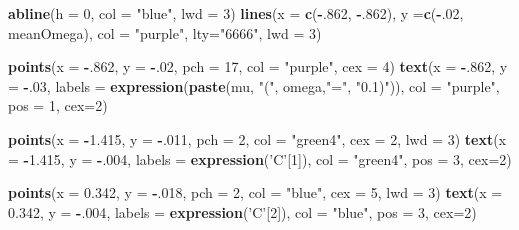 \documentclass[]{article}
\newenvironment{Shaded}{\begin{snugshade}}{\end{snugshade}}
\newcommand{\KeywordTok}[1]{\textcolor[rgb]{0.13,0.29,0.53}{\textbf{#1}}}
\newcommand{\DataTypeTok}[1]{\textcolor[rgb]{0.13,0.29,0.53}{#1}}
\newcommand{\DecValTok}[1]{\textcolor[rgb]{0.00,0.00,0.81}{#1}}
\newcommand{\FloatTok}[1]{\textcolor[rgb]{0.00,0.00,0.81}{#1}}
\newcommand{\StringTok}[1]{\textcolor[rgb]{0.31,0.60,0.02}{#1}}
\newcommand{\OperatorTok}[1]{\textcolor[rgb]{0.81,0.36,0.00}{\textbf{#1}}}
\newcommand{\NormalTok}[1]{#1}
\begin{document}
\begin{Shaded}
\begin{Highlighting}[]
\KeywordTok{abline}\NormalTok{(}\DataTypeTok{h =} \DecValTok{0}\NormalTok{, }\DataTypeTok{col =} \StringTok{"blue"}\NormalTok{, }\DataTypeTok{lwd =} \DecValTok{3}\NormalTok{)}
\KeywordTok{lines}\NormalTok{(}\DataTypeTok{x =} \KeywordTok{c}\NormalTok{(}\OperatorTok{-}\NormalTok{.}\DecValTok{862}\NormalTok{, }\OperatorTok{-}\NormalTok{.}\DecValTok{862}\NormalTok{), }\DataTypeTok{y =}\KeywordTok{c}\NormalTok{(}\OperatorTok{-}\NormalTok{.}\DecValTok{02}\NormalTok{, meanOmega), }\DataTypeTok{col =} \StringTok{"purple"}\NormalTok{, }\DataTypeTok{lty=}\StringTok{"6666"}\NormalTok{, }\DataTypeTok{lwd =} \DecValTok{3}\NormalTok{)}

\KeywordTok{points}\NormalTok{(}\DataTypeTok{x =} \OperatorTok{-}\NormalTok{.}\DecValTok{862}\NormalTok{, }\DataTypeTok{y =} \OperatorTok{-}\NormalTok{.}\DecValTok{02}\NormalTok{, }\DataTypeTok{pch =} \DecValTok{17}\NormalTok{, }\DataTypeTok{col =} \StringTok{"purple"}\NormalTok{, }\DataTypeTok{cex =} \DecValTok{4}\NormalTok{)}
\KeywordTok{text}\NormalTok{(}\DataTypeTok{x =}  \OperatorTok{-}\NormalTok{.}\DecValTok{862}\NormalTok{, }\DataTypeTok{y =} \OperatorTok{-}\NormalTok{.}\DecValTok{03}\NormalTok{, }\DataTypeTok{labels =} \KeywordTok{expression}\NormalTok{(}\KeywordTok{paste}\NormalTok{(mu, }\StringTok{"("}\NormalTok{, omega,}\StringTok{"="}\NormalTok{, }\StringTok{"0.1)"}\NormalTok{)), }\DataTypeTok{col =} \StringTok{"purple"}\NormalTok{, }\DataTypeTok{pos =} \DecValTok{1}\NormalTok{, }\DataTypeTok{cex=}\DecValTok{2}\NormalTok{)}

\KeywordTok{points}\NormalTok{(}\DataTypeTok{x =} \OperatorTok{-}\FloatTok{1.415}\NormalTok{, }\DataTypeTok{y =} \OperatorTok{-}\NormalTok{.}\DecValTok{011}\NormalTok{, }\DataTypeTok{pch =} \DecValTok{2}\NormalTok{, }\DataTypeTok{col =} \StringTok{"green4"}\NormalTok{, }\DataTypeTok{cex =} \DecValTok{2}\NormalTok{, }\DataTypeTok{lwd =} \DecValTok{3}\NormalTok{)}
\KeywordTok{text}\NormalTok{(}\DataTypeTok{x =}  \OperatorTok{-}\FloatTok{1.415}\NormalTok{, }\DataTypeTok{y =} \OperatorTok{-}\NormalTok{.}\DecValTok{004}\NormalTok{, }\DataTypeTok{labels =} \KeywordTok{expression}\NormalTok{(}\StringTok{'C'}\NormalTok{[}\DecValTok{1}\NormalTok{]), }\DataTypeTok{col =} \StringTok{"green4"}\NormalTok{, }\DataTypeTok{pos =} \DecValTok{3}\NormalTok{, }\DataTypeTok{cex=}\DecValTok{2}\NormalTok{)}

\KeywordTok{points}\NormalTok{(}\DataTypeTok{x =} \FloatTok{0.342}\NormalTok{, }\DataTypeTok{y =} \OperatorTok{-}\NormalTok{.}\DecValTok{018}\NormalTok{, }\DataTypeTok{pch =} \DecValTok{2}\NormalTok{, }\DataTypeTok{col =} \StringTok{"blue"}\NormalTok{, }\DataTypeTok{cex =} \DecValTok{5}\NormalTok{, }\DataTypeTok{lwd =} \DecValTok{3}\NormalTok{)}
\KeywordTok{text}\NormalTok{(}\DataTypeTok{x =}  \FloatTok{0.342}\NormalTok{, }\DataTypeTok{y =} \OperatorTok{-}\NormalTok{.}\DecValTok{004}\NormalTok{, }\DataTypeTok{labels =} \KeywordTok{expression}\NormalTok{(}\StringTok{'C'}\NormalTok{[}\DecValTok{2}\NormalTok{]), }\DataTypeTok{col =} \StringTok{"blue"}\NormalTok{, }\DataTypeTok{pos =} \DecValTok{3}\NormalTok{, }\DataTypeTok{cex=}\DecValTok{2}\NormalTok{)}
\end{Highlighting}
\end{Shaded}
\end{document}

